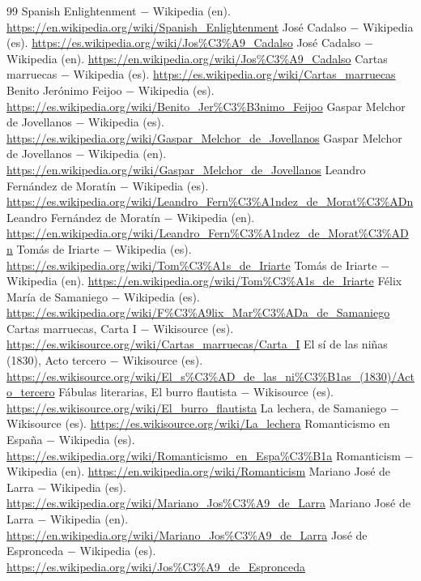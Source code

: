 \documentclass{book}
\begin{document}
\begin{thebibliography}{99}
 Spanish Enlightenment \(-\) Wikipedia (en). \url{https://en.wikipedia.org/wiki/Spanish_Enlightenment}
 José Cadalso \(-\) Wikipedia (es). \url{https://es.wikipedia.org/wiki/Jos%C3%A9_Cadalso}
 José Cadalso \(-\) Wikipedia (en). \url{https://en.wikipedia.org/wiki/Jos%C3%A9_Cadalso}
 Cartas marruecas \(-\) Wikipedia (es). \url{https://es.wikipedia.org/wiki/Cartas_marruecas}
 Benito Jerónimo Feijoo \(-\) Wikipedia (es). \url{https://es.wikipedia.org/wiki/Benito_Jer%C3%B3nimo_Feijoo}
 Gaspar Melchor de Jovellanos \(-\) Wikipedia (es). \url{https://es.wikipedia.org/wiki/Gaspar_Melchor_de_Jovellanos}
 Gaspar Melchor de Jovellanos \(-\) Wikipedia (en). \url{https://en.wikipedia.org/wiki/Gaspar_Melchor_de_Jovellanos}
 Leandro Fernández de Moratín \(-\) Wikipedia (es). \url{https://es.wikipedia.org/wiki/Leandro_Fern%C3%A1ndez_de_Morat%C3%ADn}
 Leandro Fernández de Moratín \(-\) Wikipedia (en). \url{https://en.wikipedia.org/wiki/Leandro_Fern%C3%A1ndez_de_Morat%C3%ADn}
 Tomás de Iriarte \(-\) Wikipedia (es). \url{https://es.wikipedia.org/wiki/Tom%C3%A1s_de_Iriarte}
 Tomás de Iriarte \(-\) Wikipedia (en). \url{https://en.wikipedia.org/wiki/Tom%C3%A1s_de_Iriarte}
 Félix María de Samaniego \(-\) Wikipedia (es). \url{https://es.wikipedia.org/wiki/F%C3%A9lix_Mar%C3%ADa_de_Samaniego}
 Cartas marruecas, Carta I \(-\) Wikisource (es). \url{https://es.wikisource.org/wiki/Cartas_marruecas/Carta_I}
 El sí de las niñas (1830), Acto tercero \(-\) Wikisource (es). \url{https://es.wikisource.org/wiki/El_s%C3%AD_de_las_ni%C3%B1as_(1830)/Acto_tercero}
 Fábulas literarias, El burro flautista \(-\) Wikisource (es). \url{https://es.wikisource.org/wiki/El_burro_flautista}
 La lechera, de Samaniego \(-\) Wikisource (es). \url{https://es.wikisource.org/wiki/La_lechera}
 Romanticismo en España \(-\) Wikipedia (es). \url{https://es.wikipedia.org/wiki/Romanticismo_en_Espa%C3%B1a}
 Romanticism \(-\) Wikipedia (en). \url{https://en.wikipedia.org/wiki/Romanticism}
 Mariano José de Larra \(-\) Wikipedia (es). \url{https://es.wikipedia.org/wiki/Mariano_Jos%C3%A9_de_Larra}
 Mariano José de Larra \(-\) Wikipedia (en). \url{https://en.wikipedia.org/wiki/Mariano_Jos%C3%A9_de_Larra}
 José de Espronceda \(-\) Wikipedia (es). \url{https://es.wikipedia.org/wiki/Jos%C3%A9_de_Espronceda}

\end{thebibliography}
\end{document}
